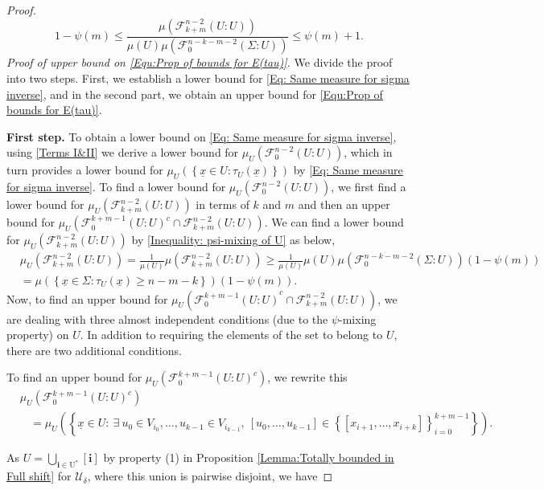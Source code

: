 \documentclass[11pt, reqno]{amsart}
\theoremstyle{plain}%
\theoremstyle{definition}
\theoremstyle{definition}
\def\U{\ensuremath{\mathcal U}}
\def\F{\ensuremath{\mathcal F}}
\def\ulx{\underline{x}}
\numberwithin{equation}{section}
\begin{document}
\begin{proof}
\begin{equation}\label{Inequality: psi-mixing of U}
    1-\psi(m)\le\frac{\mu\left( {\F_{k+m}^{n-2}(U:U)} \right)}{\mu(U)\mu\left( \F_{0}^{n-k-m-2}(\Sigma:U) \right)} \le \psi(m)+1.\end{equation}
    \textit{Proof of upper bound on \eqref{Equ:Prop of bounds for E(tau)}.} We divide the proof into two steps. First, we establish a lower bound for \eqref{Eq: Same measure for sigma inverse}, and in the second part, we obtain an upper bound for \eqref{Equ:Prop of bounds for E(tau)}. 
    
    \textbf{First step.} To obtain a lower bound on \eqref{Eq: Same measure for sigma inverse}, using \eqref{Terms I&II} we derive a lower bound for $\mu_U\left(\F_0^{n-2} (U:U)\right)$, which in turn provides a lower bound for $\mu_U \left(\left\{\ulx\in U: \tau_U(\ulx)\right\}\right)$ by \eqref{Eq: Same measure for sigma inverse}. To find a lower bound for $\mu_U\left(\F_0^{n-2} (U:U)\right)$, we first find a lower bound for $\mu_U\left(\F_{k+m}^{n-2}(U:U)\right)$ in terms of $k$ and $m$ and then an upper bound for $\mu_U\left( {\F_0^{k+m-1}(U:U)^c}\cap \F_{k+m}^{n-2}(U:U) \right)$. We can find a lower bound for $\mu_U\left(\F_{k+m}^{n-2}(U:U)\right)$ by \eqref{Inequality: psi-mixing of U} as below,
\begin{align*}
     &\mu_U\left(\F_{k+m}^{n-2}(U:U)\right)=\frac{1}{\mu(U)} \mu\left(\F_{k+m}^{n-2}(U:U)\right)\ge \frac{1}{\mu(U)} \mu(U)\mu\left( \F_{0}^{n-k-m-2}(\Sigma:U) \right)(1-\psi(m))\\&= \mu \left(\left\{\ulx\in \Sigma: \tau_U(\ulx)\ge n-m-k \right\}\right)(1-\psi(m)).
\end{align*}
 Now, to find an upper bound for $\mu_U\left( {\F_0^{k+m-1}(U:U)}^c\cap \F_{k+m}^{n-2}(U:U) \right)$, we are dealing with three almost independent conditions (due to the $\psi$-mixing property) on $U$. In addition to requiring the elements of the set to belong to $U$, there are two additional conditions. 

To find an upper bound for $\mu_U\left( {\F_0^{k+m-1}(U:U)^c}\right)$, we rewrite this
\begin{align*}
&\mu_U\left( {\F_0^{k+m-1}(U:U)^c}\right)\\& \ \ \ \ =\mu_U\left(\left\{ \ulx\in U: \ \exists\ u_0\in V_{i_0},\ldots,u_{k-1}\in V_{i_{k-1}},\ [u_0,\ldots,u_{k-1}]\in \left\{[x_{i+1},\ldots,x_{i+k}]\right\}_{i=0}^{k+m-1} \right\}\right).\end{align*} 


As $U=\bigcup_{\mathbf{i}\in \mathrm{U^*}}[\mathbf{i}]$ by property (1) in Proposition \ref{Lemma:Totally bounded in Full shift} for $\U_\delta$, where this union is pairwise disjoint, we have



\end{proof}
\end{document}
